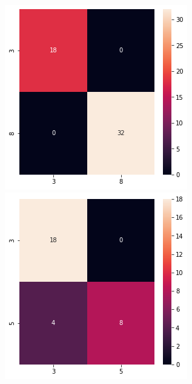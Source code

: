 \documentclass[a4paper,10pt]{report}
\begin{document}
\begin{figure}[!htb]
    \includegraphics[width=\linewidth]{3_8_cm.png}
  \endminipage\hfill
    \includegraphics[width=\linewidth]{3_5_cm.png}
  \endminipage\hfill


\end{figure}
\end{document}
